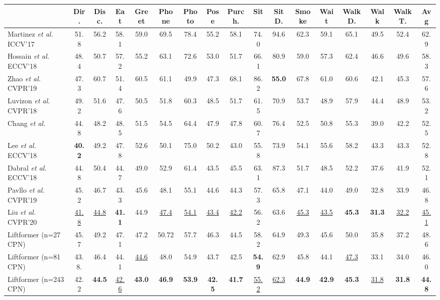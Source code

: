 \documentclass[letterpaper]{article}
\begin{document}
\begin{table*}[tp]
\begin{adjustbox}{width=1\textwidth}
\begin{tabular}{l|ccccccccccccccc|c}
& Dir. & Disc. & Eat & Greet & Phone & Photo & Pose & Purch. & Sit & SitD. & Smoke & Wait & WalkD. & Walk & WalkT. & Avg \\
\hline
Martinez \textit{et al.} ICCV’17 \cite{martinez17} & 51.8 & 56.2 & 58.1 & 59.0 & 69.5 & 78.4 & 55.2 & 58.1 & 74.0 & 94.6 & 62.3 & 59.1 & 65.1 & 49.5 & 52.4 & 62.9 \\
Hossain \textit{et al.} ECCV’18 \cite{hossain18} & 48.4 & 50.7 & 57.2 & 55.2 & 63.1 & 72.6 & 53.0 & 51.7 & 66.1 & 80.9 & 59.0 & 57.3 & 62.4 & 46.6 & 49.6 & 58.3\\
Zhao \textit{et al.} CVPR’19 \cite{zhao19} & 47.3 & 60.7 & 51.4 & 60.5 & 61.1 & 49.9 & 47.3 & 68.1 & 86.2 & \textbf{55.0} & 67.8 & 61.0 & 60.6 & 42.1 & 45.3 & 57.6\\
Luvizon \textit{et al.} CVPR’18 \cite{luvizon18} & 49.2 & 51.6 & 47.6 & 50.5 & 51.8 & 60.3 & 48.5 & 51.7 & 61.5 & 70.9 & 53.7 & 48.9 & 57.9 & 44.4 & 48.9 & 53.2\\
Chang \textit{et al.} \cite{chang20} & 44.8 & 48.2 & 48.5 & 51.5 & 54.5 & 64.4 & 47.9 & 47.8 & 60.7 & 76.4 & 52.5 & 50.8 & 55.3 & 39.0 & 42.2 & 52.5\\
Lee \textit{et al.} ECCV’18  \cite{lee18} & \textbf{40.2} & 49.2 & 47.8 & 52.6 & 50.1 & 75.0 & 50.2 & 43.0 & 55.8 & 73.9 & 54.1 & 55.6 & 58.2 & 43.3 & 43.3 & 52.8\\
Dabral \textit{et al.} ECCV’18 \cite{dabral18} & 44.8 & 50.4 & 44.7 & 49.0 & 52.9 & 61.4 & 43.5 & 45.5 & 63.1 & 87.3 & 51.7 & 48.5 & 52.2 & 37.6 & 41.9 & 52.1\\
Pavllo \textit{et al.} CVPR’19 \cite{pavllo19}& 45.2 & 46.7 & 43.3 & 45.6 & 48.1 & 55.1 & 44.6 & 44.3 & 57.3 & 65.8 & 47.1 & 44.0 & 49.0 & 32.8 & 33.9 & 46.8\\
Liu \textit{et al.} CVPR’20 \cite{liu20} & \underline{41.8} & \underline{44.8} & \textbf{41.1} & 44.9 & \underline{47.4} & \underline{54.1} & \underline{43.4} & \underline{42.2} & 56.2 & 63.6 & \underline{45.3} & \underline{43.5} & \textbf{45.3} & \textbf{31.3} & \underline{32.2} & \underline{45.1} \\
\hline
Liftformer (n=27 CPN) & 45.7 & 49.2 & 47.1 & 47.2 & 50.72 & 57.7 & 46.3 & 44.5 & 58.2 & 64.9 & 49.3 & 45.6 & 50.0 & 35.8 & 37.2 & 48.6\\
Liftformer (n=81 CPN) & 43.8. & 46.4 & 44.1 & \underline{44.6} & 48.0 & 54.9 & 43.7 & 42.5 & \textbf{54.9} & 62.9 & 45.8 & 44.1 & \underline{47.3} & 33.1 & 34.0 & 46.0\\
Liftformer (n=243 CPN)  & 42.2 & \textbf{44.5} & \underline{42.6} & \textbf{43.0} & \textbf{46.9} & \textbf{53.9} & \textbf{42.5} & \textbf{41.7} & \underline{55.2} & \underline{62.3} & \textbf{44.9} & \textbf{42.9} & \textbf{45.3} & \underline{31.8} & \textbf{31.8} & \textbf{44.8}\\
\end{tabular}
\end{adjustbox}


\end{table*}
\end{document}
